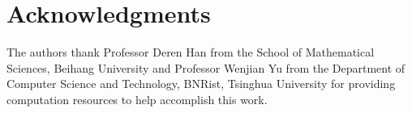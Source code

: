 \section*{Acknowledgments}


The authors thank Professor Deren Han from the School of Mathematical Sciences, Beihang University and Professor Wenjian Yu from the Department of Computer Science and Technology, BNRist, Tsinghua University for providing computation resources to help accomplish this work.
